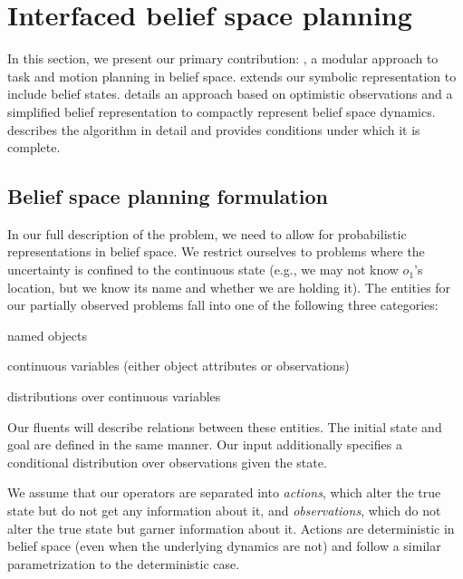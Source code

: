 \section{Interfaced belief space planning}
In this section, we present our primary contribution: \ibsp, a modular
approach to task and motion planning in belief
space.  extends our symbolic
representation to include belief states.  details
an approach based on optimistic observations and a simplified belief
representation to compactly represent belief space dynamics.
 describes the \ibsp{} algorithm in detail and provides conditions
under which it is complete.


\subsection{Belief space planning formulation}
\label{sec-bsp-formulation}
In our full description of the problem, we need to allow for
probabilistic representations in belief space. We restrict ourselves
to problems where the uncertainty is confined to the continuous state
(e.g., %
we may not know $o_1$'s location, but we know its name and whether
we are holding it). The entities for our partially observed problems
fall into one of the following three categories:
\begin{tightlist}
\item named objects
\item continuous variables (either object attributes or observations)
\item distributions over continuous variables
\end{tightlist}
Our fluents will describe relations between these entities. The
initial state and goal are defined in the same manner. Our input
additionally specifies a conditional distribution over observations
given the state.

We assume that our operators are separated into \emph{actions}, which
alter the true state but do not get any information about it, and
\emph{observations}, which do not alter the true state but garner
information about it. Actions are deterministic in belief space
(even when the underlying dynamics are not) and follow a similar
parametrization to the deterministic case.

